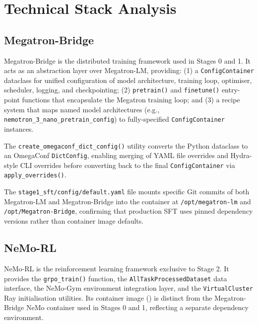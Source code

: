 
\section{Technical Stack Analysis}
\label{sec:technical-stack}

\subsection{Megatron-Bridge}
\label{subsec:megatron-bridge}

Megatron-Bridge is the distributed training framework used in Stages 0
and 1. It acts as an abstraction layer over Megatron-LM, providing:
(1) a \texttt{ConfigContainer} dataclass for unified configuration of
model architecture, training loop, optimiser, scheduler, logging, and
checkpointing; (2) \texttt{pretrain()} and \texttt{finetune()} entry-point
functions that encapsulate the Megatron training loop; and (3) a recipe
system that maps named model architectures (e.g.,
\texttt{nemotron\_3\_nano\_pretrain\_config}) to fully-specified
\texttt{ConfigContainer} instances.

The \texttt{create\_omegaconf\_dict\_config()} utility converts the
Python dataclass to an OmegaConf \texttt{DictConfig}, enabling merging
of YAML file overrides and Hydra-style CLI overrides before converting
back to the final \texttt{ConfigContainer} via \texttt{apply\_overrides()}.

The \texttt{stage1\_sft/config/default.yaml} file mounts specific Git
commits of both Megatron-LM and Megatron-Bridge into the container at
\texttt{/opt/megatron-lm} and \texttt{/opt/Megatron-Bridge}, confirming
that production SFT uses pinned dependency versions rather than container
image defaults.

\subsection{NeMo-RL}
\label{subsec:nemo-rl}

NeMo-RL is the reinforcement learning framework exclusive to Stage 2.
It provides the \texttt{grpo\_train()} function, the
\texttt{AllTaskProcessedDataset} data interface, the NeMo-Gym environment
integration layer, and the \texttt{VirtualCluster} Ray initialisation
utilities. Its container image ()
is distinct from the Megatron-Bridge NeMo container used in Stages 0
and 1, reflecting a separate dependency environment.

